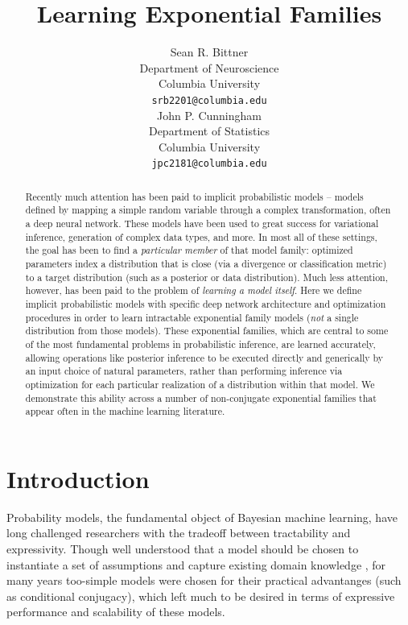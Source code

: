 \documentclass{article}
\title{Learning Exponential Families}
\author{
  Sean R. Bittner \\ %
  Department of Neuroscience\\
  Columbia University\\
  \texttt{srb2201@columbia.edu} \\
 \And
John P. Cunningham \\
Department of Statistics\\
  Columbia University\\
 \texttt{jpc2181@columbia.edu} \\
}
\begin{document}

\maketitle

\begin{abstract}
  
Recently much attention has been paid to implicit probabilistic models -- models defined by mapping a simple random variable through a complex transformation, often a deep neural network.  These models have been used to great success for variational inference, generation of complex data types, and more.  In most all of these settings, the goal has been to find a \emph{particular member} of that model family: optimized parameters index a distribution that is close (via a divergence or classification metric) to a target distribution (such as a posterior or data distribution).  Much less attention, however, has been paid to the problem of \emph{learning a model itself}.   Here we define implicit probabilistic models with specific deep network architecture and optimization procedures in order to learn intractable exponential family models (\emph{not} a single distribution from those models).  These exponential families, which are central to some of the most fundamental problems in probabilistic inference, are learned accurately, allowing operations like posterior inference to be executed directly and generically by an input choice of natural parameters, rather than performing inference via optimization for each particular realization of a distribution within that model.  We demonstrate this ability across a number of non-conjugate exponential families that appear often in the machine learning literature.
  
\end{abstract}

\section{Introduction}

Probability models, the fundamental object of Bayesian machine learning, have long challenged researchers with the tradeoff between tractability and expressivity.
Though well understood that a model should be chosen to instantiate a set of assumptions and capture existing domain knowledge \cite{gelman2014bayesian, tenenbaum2006theory, mccullagh2002}, for many years too-simple models were chosen for their practical advantanges (such as conditional conjugacy), which left much to be desired in terms of expressive performance and scalability of these models.  
\end{document}
